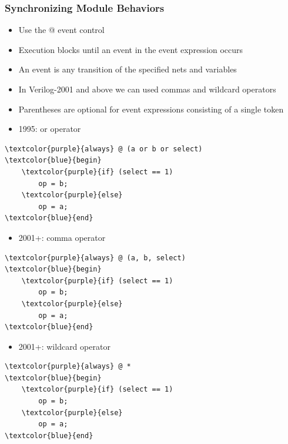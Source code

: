 \documentclass[t]{beamer}
\begin{document}
\begin{frame}[fragile]
\frametitle{Synchronizing Module Behaviors}

\begin{multicols}{2}
\begin{itemize}
\item Use the @ event control
\item Execution blocks until an event in the event expression occurs
\item An event is any transition of the specified nets and variables
\item In Verilog-2001 and above we can used commas and wildcard operators
\item Parentheses are optional for event expressions consisting of a single token
\end{itemize}

\columnbreak
\begin{itemize}
\item 1995: or operator
\end{itemize}
{\tiny%
\begin{Verbatim}[commandchars=\\\{\}, tabsize=2]
\textcolor{purple}{always} @ (a or b or select)
\textcolor{blue}{begin}
	\textcolor{purple}{if} (select == 1)
		op = b;
	\textcolor{purple}{else}
		op = a;
\textcolor{blue}{end}
\end{Verbatim}
}
\begin{itemize}
\item 2001+: comma operator
\end{itemize}
{\tiny%
\begin{Verbatim}[commandchars=\\\{\}, tabsize=2]
\textcolor{purple}{always} @ (a, b, select)
\textcolor{blue}{begin}
	\textcolor{purple}{if} (select == 1)
		op = b;
	\textcolor{purple}{else}
		op = a;
\textcolor{blue}{end}
\end{Verbatim}
}
\begin{itemize}
\item 2001+: wildcard operator
\end{itemize}
{\tiny%
\begin{Verbatim}[commandchars=\\\{\}, tabsize=2]
\textcolor{purple}{always} @ *
\textcolor{blue}{begin}
	\textcolor{purple}{if} (select == 1)
		op = b;
	\textcolor{purple}{else}
		op = a;
\textcolor{blue}{end}
\end{Verbatim}
}
\end{multicols}
\end{frame}
\end{document}
